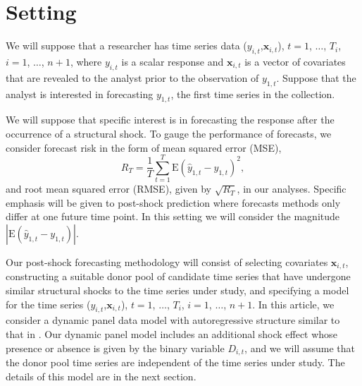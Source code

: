 \documentclass[11pt]{article}
\newcommand{\x}{\textbf{x}}
\def\E#1{\mathrm{E}(#1)} %
\theoremstyle{definition}
\begin{document}
\section{Setting}
\label{setting}

We will suppose that a researcher has time series data ($y_{i,t}$,$\x_{i,t}$), $t = 1$, $\ldots$, $T_i$, $i = 1$, $\ldots$, $n+1$, where $y_{i,t}$ is a scalar response and $\x_{i,t}$ is a vector of covariates that are revealed to the analyst prior to the observation of $y_{1,t}$.  Suppose that the analyst is interested in forecasting $y_{1,t}$, the first time series in the collection. 

We will suppose that specific interest is in forecasting the response after the occurrence of a structural shock. To gauge the performance of forecasts, we consider forecast risk in the form of mean squared error (MSE),
$$
  R_T = \frac{1}{T}\sum_{t=1}^T\E{\hat y_{1,t} - y_{1,t}}^2,
$$
and root mean squared error (RMSE), given by $\sqrt{R_T}$, in our analyses. Specific emphasis will be given to post-shock prediction where forecasts methods only differ at one future time point. In this setting we will consider the magnitude $|\E{\hat y_{1,t} - y_{1,t}}|$.


Our post-shock forecasting methodology will consist of selecting covariates $\x_{i,t}$, constructing a suitable donor pool of candidate time series that have undergone similar structural shocks to the time series under study, and specifying a model for the time series ($y_{i,t}$,$\x_{i,t}$), $t = 1$, $\ldots$, $T_i$, $i = 1$, $\ldots$, $n+1$. In this article, we consider a dynamic panel data model with autoregressive structure similar to that in \citet{blundell1998initial}. Our dynamic panel model includes an additional shock effect whose presence or absence is given by the binary variable $D_{i,t}$, and we will assume that the donor pool time series are independent of the time series under study. The details of this model are in the next section.
\end{document}
